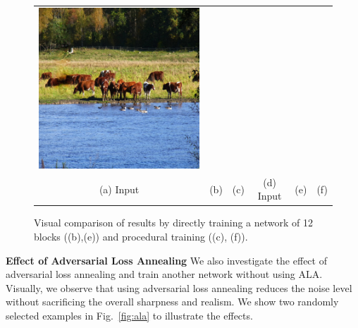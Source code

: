 \begin{figure}[!ht]
\begin{tabular}{cccccc}
\includegraphics[width=.17\textwidth]{figures/proc/000000314034_synthesized_image.jpg}\\
(a) Input & (b)  & (c)  & (d) Input & (e)  & (f)  \\
\end{tabular}
\caption{Visual comparison of results by directly training a network of 12 blocks ((b),(e)) and procedural training ((c), (f)).}
\label{fig:proc}
\end{figure}  

\noindent\textbf{Effect of Adversarial Loss Annealing} We also investigate the effect of adversarial loss annealing and train another network without using ALA. Visually, we observe that using adversarial loss annealing reduces the noise level without sacrificing the overall sharpness and realism. We show two randomly selected examples in Fig.~\ref{fig:ala} to illustrate the effects. 

